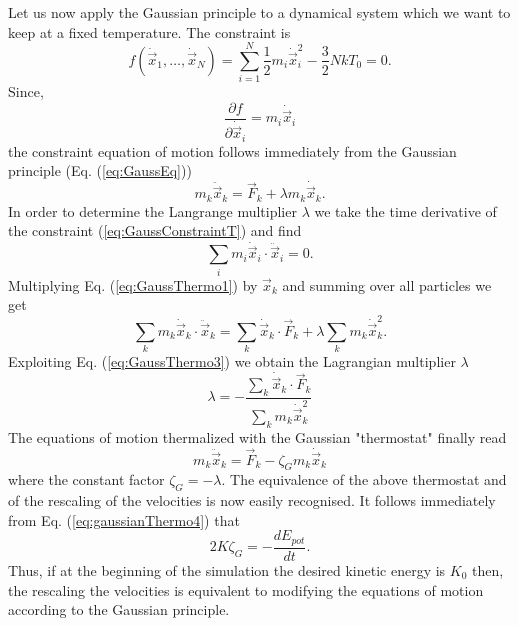 Let us now apply the Gaussian principle to a dynamical system which we want to
keep at a fixed temperature. The constraint is
\begin{equation}
\label{eq:GaussConstraintT}
  f(\dot{\vec{x}}_1, \ldots,\dot{\vec{x}}_N) =
         \sum_{i=1}^N \frac{1}{2} m_i \dot{\vec{x}}_i^2 - \frac{3}{2}NkT_0 =0.
\end{equation}
Since,
\begin{displaymath}
  \frac{\partial f}{\partial \dot{\vec{x}}_i} =  m_i \dot{\vec{x}}_i
\end{displaymath}
the constraint equation of motion follows immediately from 
the Gaussian principle
(Eq. (\ref{eq:GaussEq}))
\begin{equation}
  \label{eq:GaussThermo1}
   m_k \ddot{\vec{x}}_k = \vec{F}_k + \lambda m_k \dot{\vec{x}}_k.
\end{equation}
In order to determine the Langrange multiplier $\lambda$ we take the time
derivative of the constraint (\ref{eq:GaussConstraintT}) and find
\begin{equation}
\label{eq:GaussThermo3}
  \sum_i m_i \dot{\vec{x}}_i \cdot \ddot{\vec{x}}_i =0.
\end{equation}
Multiplying Eq. (\ref{eq:GaussThermo1}) by $\vec{x}_k$ and summing over all
particles  we get
\begin{displaymath}
  \sum_k m_k \dot{\vec{x}}_k \cdot \ddot{\vec{x}}_k = 
      \sum_k  \dot{\vec{x}}_k \cdot\vec{F}_k + 
           \lambda \sum_k m_k \dot{\vec{x}}_k^2.
\end{displaymath}
Exploiting Eq. (\ref{eq:GaussThermo3}) we  obtain the Lagrangian
multiplier $\lambda$
\begin{equation}
\label{eq:gaussianThermo4}
  \lambda = - \frac{\sum_k  \dot{\vec{x}}_k \cdot\vec{F}_k}
                   {\sum_k m_k \dot{\vec{x}}_k^2}
\end{equation}
The equations of motion thermalized with the Gaussian "thermostat" finally
read
\begin{displaymath}
  m_k \ddot{\vec{x}}_k = \vec{F}_k - \zeta_G m_k \dot{\vec{x}}_k
\end{displaymath}
where the constant factor $\zeta_G = - \lambda$.
The equivalence of the above thermostat and of the rescaling of the velocities
is now easily recognised. It follows immediately from Eq. 
(\ref{eq:gaussianThermo4})  that
\begin{displaymath}
2 K \zeta_G = - \frac{d E_{pot}}{dt}.    
\end{displaymath}
Thus, if at the beginning of the simulation the desired kinetic energy is
$K_0$ then, the rescaling the velocities is equivalent to
modifying the equations of motion according to the Gaussian principle.

